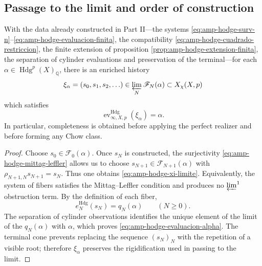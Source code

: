 \subsection{Passage to the limit and order of construction}
\label{subsec:amp-hodge-paso-limite}

\begin{theorem}
\label{thm:amp-hodge-completitud-coinductiva}
With the data already constructed in Part II---the systems
\eqref{eq:amp-hodge-surv-n}--\eqref{eq:amp-hodge-evaluacion-finita}, the
compatibility \eqref{eq:amp-hodge-cuadrado-restriccion}, the finite extension
of proposition \ref{prop:amp-hodge-extension-finita}, the separation of
cylinder evaluations and preservation of the terminal---for each
\(\alpha\in\operatorname{Hdg}^p(X)_{\mathbb Q}\), there is an enriched
history
\begin{equation}\label{eq:amp-hodge-xi-limite}
 \xi_\alpha=(s_0,s_1,s_2,\ldots)
 \in\varprojlim_N\mathscr F_N(\alpha)
 \subset X_\chi(X,p)
\end{equation}
which satisfies
\begin{equation}\label{eq:amp-hodge-evaluacion-alpha}
 \operatorname{ev}^{\mathrm{Hdg}}_{\infty,X,p}(\xi_\alpha)=\alpha.
\end{equation}
In particular, completeness is obtained before applying the perfect
realizer and before forming any Chow class.
\end{theorem}

\begin{proof}
Choose \(s_0\in\mathscr F_0(\alpha)\). Once \(s_N\) is constructed, the
surjectivity \eqref{eq:amp-hodge-mittag-leffler} allows us to choose
\(s_{N+1}\in\mathscr F_{N+1}(\alpha)\) with
\(\rho_{N+1,N}s_{N+1}=s_N\). Thus one obtains
\eqref{eq:amp-hodge-xi-limite}. Equivalently, the system of fibers
satisfies the Mittag--Leffler condition and produces no
\(\varprojlim^1\) obstruction term. By the definition of each fiber,
\begin{equation}\label{eq:amp-hodge-evaluaciones-xi}
 e_N^{\mathrm{Hdg}}(s_N)=q_N(\alpha)
 \qquad(N\geq0).
\end{equation}
The separation of cylinder observations identifies the unique element
of the limit of the \(q_N(\alpha)\) with \(\alpha\), which proves
\eqref{eq:amp-hodge-evaluacion-alpha}. The terminal cone prevents replacing the
sequence \((s_N)_N\) with the repetition of a visible root; therefore
\(\xi_\alpha\) preserves the rigidification used in passing to the limit.
\end{proof}

